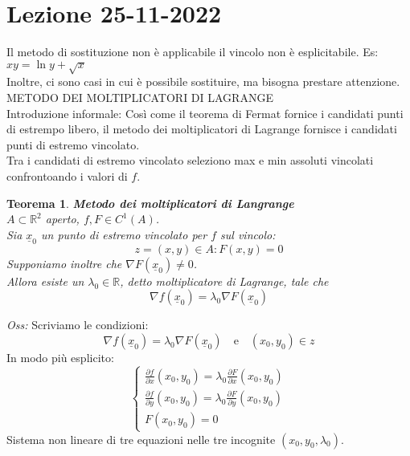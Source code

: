 \documentclass{scrreprt}
\newtheorem{teorema}{Teorema}
\newenvironment{thm}{\begin{mdframed}[backgroundcolor=Ivory2]\begin{teorema}}{\end{teorema}\end{mdframed}}
\begin{document}
\section*{Lezione 25-11-2022}
Il metodo di sostituzione non è applicabile il vincolo non è esplicitabile.
Es: $xy = \ln y + \sqrt{x}$\\
Inoltre, ci sono casi in cui è possibile sostituire, ma bisogna prestare attenzione.\\


METODO DEI MOLTIPLICATORI DI LAGRANGE\\
Introduzione informale: Così come il teorema di Fermat fornice i candidati punti di estrempo libero, il metodo dei moltiplicatori di Lagrange fornisce i candidati punti di estremo vincolato.\\
Tra i candidati di estremo vincolato seleziono max e min assoluti vincolati confrontoando i valori di $f$.\\

\begin{thm} \textbf{Metodo dei moltiplicatori di Langrange}\\
	$A \subset \mathbb{R}^2$ aperto, $f,F \in C^1(A)$.\\
	Sia $\underline{x}_0$ un punto di estremo vincolato per $f$ sul vincolo:
	\begin{equation}
		z = {(x,y) \in A: F(x,y) = 0}
	\end{equation}
	Supponiamo inoltre che $\nabla F(\underline{x}_0) \neq 0$.\\
	Allora esiste un $\lambda_0 \in \mathbb{R}$, detto moltiplicatore di Lagrange, tale che 
	\begin{equation}
		\nabla f(\underline{x}_0) = \lambda_0 \nabla F(\underline{x}_0)
	\end{equation}
\end{thm}
\emph{Oss:} Scriviamo le condizioni:
\begin{equation}
	\nabla f(\underline{x}_0) = \lambda_0 \nabla F(\underline{x}_0) \quad \text{e} \quad (x_0,y_0) \in z
\end{equation}
In modo più esplicito:
\begin{equation}
	\begin{cases}
		\frac{\partial f}{\partial x} (x_0,y_0) = \lambda_0 \frac{\partial F}{\partial x} (x_0,y_0)\\
		\frac{\partial f}{\partial y} (x_0,y_0) = \lambda_0 \frac{\partial F}{\partial y} (x_0,y_0)\\
		F(x_0,y_0) = 0
	\end{cases}
\end{equation}
Sistema non lineare di tre equazioni nelle tre incognite $(x_0,y_0,\lambda_0)$.\\
\end{document}

